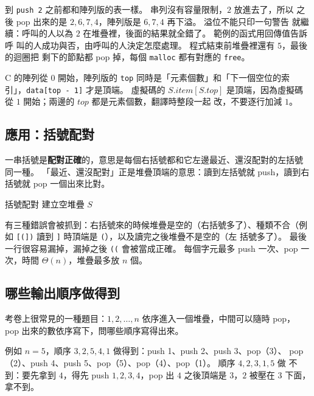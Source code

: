 到 \texttt{push 2} 之前都和陣列版的表一樣。 串列沒有容量限制，$2$ 放進去了，所以
之後 pop 出來的是 $2, 6, 7, 4$，陣列版是 $6, 7, 4$ 再下溢。 溢位不能只印一句警告
就繼續：呼叫的人以為 $2$ 在堆疊裡，後面的結果就全錯了。 範例的函式用回傳值告訴呼
叫的人成功與否，由呼叫的人決定怎麼處理。 程式結束前堆疊裡還有 $5$，最後的迴圈把
剩下的節點都 pop 掉，每個 \texttt{malloc} 都有對應的 \texttt{free}。

C 的陣列從 $0$ 開始，陣列版的 \texttt{top} 同時是「元素個數」和「下一個空位的索
引」，\texttt{data[top - 1]} 才是頂端。 虛擬碼的 $S.\mathit{item}[S.\mathit{top}]$
是頂端，因為虛擬碼從 $1$ 開始；兩邊的 $\mathit{top}$ 都是元素個數，翻譯時整段一起
改，不要逐行加減 $1$。

\subsection{應用：括號配對}
\label{sec:sq-brackets}

一串括號是\textbf{配對正確}的，意思是每個右括號都和它左邊最近、還沒配對的左括號
同一種。 「最近、還沒配對」正是堆疊頂端的意思：讀到左括號就 push，讀到右括號就
pop 一個出來比對。

\begin{pseudo}[label=alg:sq-brackets]{括號配對}
    \State 建立空堆疊 $S$
            \State {}
                \State \Return \FALSE
            \EndIf
        \EndIf
    \EndFor
    \State \Return {}
\EndFunction
\end{pseudo}

有三種錯誤會被抓到：右括號來的時候堆疊是空的（右括號多了）、種類不合（例如
\texttt{[(])} 讀到 \texttt{]} 時頂端是 \texttt{(}），以及讀完之後堆疊不是空的（左
括號多了）。 最後一行很容易漏掉，漏掉之後 \texttt{((} 會被當成正確。 每個字元最多
push 一次、pop 一次，時間 $\Theta(n)$，堆疊最多放 $n$ 個。

\subsection{哪些輸出順序做得到}
\label{sec:sq-perm}

考卷上很常見的一種題目：$1, 2, \ldots, n$ 依序進入一個堆疊，中間可以隨時 pop，
pop 出來的數依序寫下，問哪些順序寫得出來。

例如 $n = 5$，順序 $3, 2, 5, 4, 1$ 做得到：push 1、push 2、push 3、pop（3）、
pop（2）、push 4、push 5、pop（5）、pop（4）、pop（1）。 順序 $4, 2, 3, 1, 5$ 做
不到：要先拿到 $4$，得先 push $1, 2, 3, 4$，pop 出 $4$ 之後頂端是 $3$，$2$ 被壓在
$3$ 下面，拿不到。

